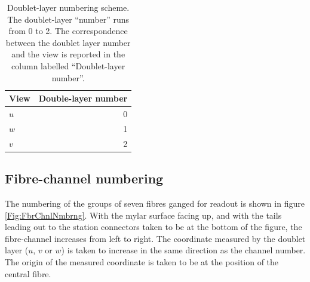 \begin{table}
  \caption{Doublet-layer numbering scheme.  The doublet-layer ``number'' runs from 0 to 2. The correspondence between the doublet layer number and the  view is reported in the column labelled ``Doublet-layer number''.}
  \label{Tab:DblLyrOrder}
  \begin{tabular}{|l|r|}
    \hline
    {\bf View} & {\bf Double-layer number} \\
    \hline
    $u$        &                         0 \\
    $w$        &                         1 \\
    $v$        &                         2 \\
    \hline
  \end{tabular}
\end{table}

\subsection{Fibre-channel numbering}
\label{SubSect:FbrNmbrng}

The numbering of the groups of seven fibres ganged for readout is shown in figure \ref{Fig:FbrChnlNmbrng}. With the mylar surface facing up, and with the tails leading out to the station connectors taken to be at the bottom of the figure, the fibre-channel increases from left to right. The coordinate measured by the doublet layer ($u$, $v$ or $w$) is taken to increase in the same direction as the channel number. The origin of the measured coordinate is taken to be at the position of the central fibre.

